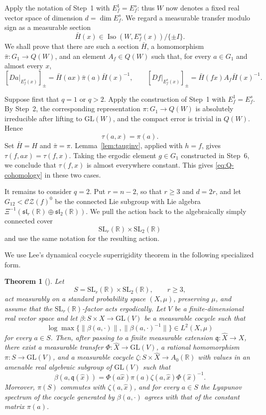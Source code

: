 \documentclass[11pt]{amsart}
\numberwithin{equation}{section}
\newcommand{\CZ}{\mathcal{CZ}}
\newcommand{\SL}{\mathrm{SL}}
\newcommand{\GL}{\mathrm{GL}}
\theoremstyle{plain}
\newtheorem{thm}{Theorem}[section]
\begin{document}
Apply the notation of Step~1 with $E_f^1=E_f^s$: thus $W$ now denotes
a fixed real vector space of dimension $d=\dim E_f^s$.
We regard a measurable transfer modulo sign as a measurable section
\[
\bar H(x)\in
\operatorname{Iso}(W,E_f^s(x))/\{\pm I\}.
\]
We shall prove that there are such a section $\bar H$, a homomorphism
$\bar\pi:G_1\to Q(W)$, and an element $A_f\in Q(W)$ such that, for
every $a\in G_1$ and almost every $x$,
\begin{equation}\label{eq:Q-cohomology}
[Da|_{E_f^s(x)}]_\pm
 =\bar H(ax)\bar\pi(a)\bar H(x)^{-1},
\qquad
[Df|_{E_f^s(x)}]_\pm
 =\bar H(fx)A_f\bar H(x)^{-1}.
\end{equation}

Suppose first that $q=1$ or $q>2$. Apply the construction of
Step~1 with $E_f^1=E_f^s$. By Step~2, the corresponding
representation $\pi:G_1\to Q(W)$ is absolutely irreducible after
lifting to $\GL(W)$, and the compact error is trivial in $Q(W)$. Hence
\[
\tau(a,x)=\pi(a).
\]
Set $\bar H=H$ and $\bar\pi=\pi$. Lemma~\ref{lem:tauginv}, applied with
$h=f$, gives $\tau(f,ax)=\tau(f,x)$. Taking the ergodic
element $g\in G_1$ constructed in Step~6, we conclude that
$\tau(f,x)$ is almost everywhere constant. This gives
\eqref{eq:Q-cohomology} in these two cases.

It remains to consider $q=2$. Put $r=n-2$, so that $r\ge3$ and
$d=2r$, and let $G_{12}<\CZ(f)^0$ be the connected Lie
subgroup with Lie algebra
$\Xi^{-1}(\mathfrak{sl}_r(\mathbb R)\oplus
\mathfrak{sl}_2(\mathbb R))$.
We pull the action back to the algebraically simply connected cover
\[
\SL_r(\mathbb R)\times\SL_2(\mathbb R)
\]
and use the same notation for the resulting action.

We use Lee's dynamical cocycle superrigidity theorem in the following
specialized form.

\begin{thm}[{\cite[Theorem~4.3]{Lee}}]\label{thm:lee}
Let
\[
S=\SL_r(\mathbb R)\times\SL_2(\mathbb R),\qquad r\ge3,
\]
act measurably on a standard probability space $(X,\mu)$, preserving
$\mu$, and assume that the $\SL_r(\mathbb R)$-factor acts ergodically.
Let $V$ be a finite-dimensional real vector space and let
$\beta:S\times X\to\GL(V)$ be a measurable cocycle such that
\[
\log\max\{\|\beta(a,\cdot)\|,\|\beta(a,\cdot)^{-1}\|\}\in L^2(X,\mu)
\]
for every $a\in S$. Then, after passing to a finite measurable
extension $\mathfrak q:\widehat X\to X$, there exist a measurable
transfer $\Phi:\widehat X\to\GL(V)$, a rational homomorphism
$\pi:S\to\GL(V)$, and a measurable cocycle
$\zeta:S\times\widehat X\to A_0(\mathbb R)$ with values in an amenable
real algebraic subgroup of $\GL(V)$ such that
\[
\beta(a,\mathfrak q(\hat x))
 =\Phi(a\hat x)\pi(a)\zeta(a,\hat x)\Phi(\hat x)^{-1}.
\]
Moreover, $\pi(S)$ commutes with $\zeta(a,\hat x)$, and for every
$a\in S$ the Lyapunov spectrum of the cocycle generated by
$\beta(a,\cdot)$ agrees with that of the constant matrix $\pi(a)$.
\end{thm}
\end{document}
